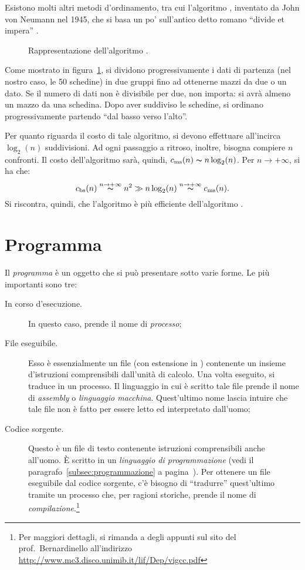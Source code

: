 Esistono  molti altri metodi d'ordinamento, tra cui l'algoritmo , inventato da John von Neumann nel 1945, che si basa un po' sull'antico detto romano ``divide et impera'' \parencite{wiki:it}.
\begin{figure}
	\centering
\subfloat[][Suddivisione.]{
	
}\quad
\subfloat[][Ordinamento.]{
	
}

	\caption[Merge sort]{Rappresentazione dell'algoritmo .}
	\label{fig:merge}
\end{figure}
Come mostrato in figura~\ref{fig:merge}, si dividono progressivamente i dati di partenza (nel nostro caso, le \num{50} schedine) in due gruppi fino ad ottenerne mazzi da due o un dato.
Se il numero di dati non è divisibile per due, non importa: si avrà almeno un mazzo da una schedina.
Dopo aver suddiviso le schedine, si ordinano progressivamente partendo ``dal basso verso l'alto''.

Per quanto riguarda il costo di tale algoritmo, si devono effettuare all'incirca $\log_2(n)$ suddivisioni.
Ad ogni passaggio a ritroso, inoltre, bisogna compiere $n$ confronti.
Il costo dell'algoritmo sarà, quindi, $c_\textup{ms}(n)\thicksim n\log_{2}(n)$. Per $n\to+\infty$, si ha che:
\[
c_\textup{bs}(n)\overset{n\to+\infty}{\thicksim} n^{2} \gg n\log_{2}(n) \overset{n\to+\infty}{\thicksim} c_\textup{ms}(n).
\]
Si riscontra, quindi, che l'algoritmo  è più efficiente dell'algoritmo .


	\section{Programma}
Il \emph{programma} è un oggetto che si può presentare sotto varie forme. Le più importanti sono tre:
\begin{description}
	\item[In corso d'esecuzione.] In questo caso, prende il nome di \emph{processo};
	\item[File eseguibile.] Esso è essenzialmente un file (con estensione  in ) contenente un insieme d'istruzioni comprensibili dall'unità di calcolo. Una volta eseguito, si traduce in un processo. Il linguaggio in cui è scritto tale file prende il nome di \emph{assembly} o \emph{linguaggio macchina}. Quest'ultimo nome lascia intuire che tale file non è fatto per essere letto ed interpretato dall'uomo;
	\item[Codice sorgente.] Questo è un file di testo contenente istruzioni comprensibili anche all'uomo. \`E scritto in un \emph{linguaggio di programmazione} (vedi il paragrafo~\ref{subsec:programmazione} a pagina~\pageref{subsec:programmazione}). Per ottenere un file eseguibile dal codice sorgente, c'è bisogno di ``tradurre'' quest'ultimo tramite un processo che, per ragioni storiche, prende il nome di \emph{compilazione}.\footnote{Per maggiori dettagli, si rimanda a degli appunti sul sito del prof.~Bernardinello all'indirizzo \url{http://www.mc3.disco.unimib.it/lif/Dep/vigcc.pdf}}
\end{description}